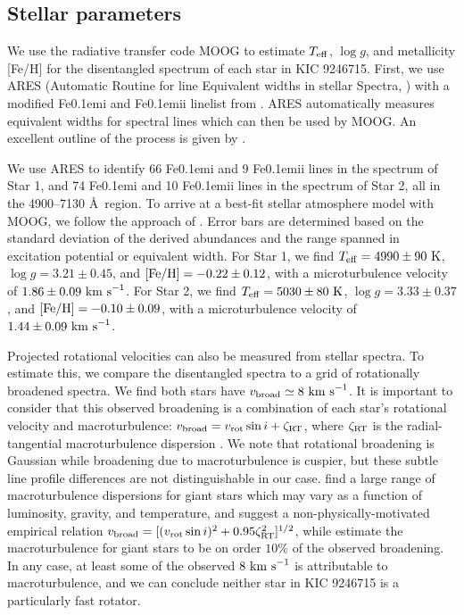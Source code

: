 \subsection{Stellar parameters}\label{parameters}
We use the radiative transfer code MOOG \citep{sne73} to estimate $T_{\rm{eff}}$, $\log g$, and metallicity [Fe/H] for the disentangled spectrum of each star in KIC 9246715. First, we use ARES (Automatic Routine for line Equivalent widths in stellar Spectra, \citealt{Sousa_2007}) with a modified {\rm Fe}\kern 0.1em{\sc i} and {\rm Fe}\kern 0.1em{\sc ii} linelist from \citet{tsa13}. ARES automatically measures equivalent widths for spectral lines which can then be used by MOOG. An excellent outline of the process is given by \citet{Sousa_2014}.

We use ARES to identify 66 {\rm Fe}\kern 0.1em{\sc i} and 9 {\rm Fe}\kern 0.1em{\sc ii} lines in the spectrum of Star 1, and 74 {\rm Fe}\kern 0.1em{\sc i} and 10 {\rm Fe}\kern 0.1em{\sc ii} lines in the spectrum of Star 2, all in the 4900--7130 \AA \ region. To arrive at a best-fit stellar atmosphere model with MOOG, we follow the approach of \citet{mag13}. Error bars are determined based on the standard deviation of the derived abundances and the range spanned in excitation potential or equivalent width. For Star 1, we find $T_{\rm{eff}} = 4990 \pm 90 \ \rm{K}$, $\log g = 3.21 \pm 0.45$, and $\rm{[Fe/H]} = -0.22 \pm 0.12$, with a microturbulence velocity of $1.86 \pm 0.09 \ \rm{km \ s}^{-1}$. For Star 2, we find $T_{\rm{eff}} = 5030 \pm 80 \ \rm{K}$, $\log g = 3.33 \pm 0.37$, and $\rm{[Fe/H]} = -0.10 \pm 0.09$, with a microturbulence velocity of $1.44 \pm 0.09 \ \rm{km \ s}^{-1}$.

Projected rotational velocities can also be measured from stellar spectra. To estimate this, we compare the disentangled spectra to a grid of rotationally broadened spectra. We find both stars have $v_{\rm{broad}} \simeq 8 \ \rm{km \ s}^{-1}$. It is important to consider that this observed broadening is a combination of each star's rotational velocity and macroturbulence: $v_{\rm{broad}} = v_{\rm{rot}} \sin i + \zeta_{\rm{RT}}$, where $\zeta_{\rm{RT}}$ is the radial-tangential macroturbulence dispersion \citep{gra78}. We note that rotational broadening is Gaussian while broadening due to macroturbulence is cuspier, but these subtle line profile differences are not distinguishable in our case. \citet{car08} find a large range of macroturbulence dispersions for giant stars which may vary as a function of luminosity, gravity, and temperature, and suggest a non-physically-motivated empirical relation $v_{\rm{broad}} = [(v_{\rm{rot}} \sin i)^2 + 0.95\zeta_{\rm{RT}}^2]^{1/2}$, while \citet{tay15} estimate the macroturbulence for giant stars to be on order $10 \%$ of the observed broadening. In any case, at least some of the observed $8 \ \rm{km \ s}^{-1}$ is attributable to macroturbulence, and we can conclude neither star in KIC 9246715 is a particularly fast rotator.
